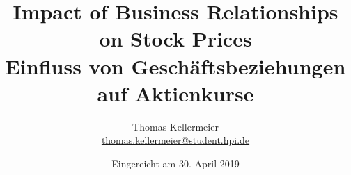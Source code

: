\titlehead{
    \hfill\texttt{[image: setup/logo/01\_UP]} \hfill \texttt{[image: setup/logo/hpi\_logo]}
}
\subject{Masterarbeit}
\title{
    Impact of Business Relationships on Stock Prices
    \\ \bigskip
    \large{Einfluss von Gesch\"aftsbeziehungen auf Aktienkurse}
}
\author{Thomas Kellermeier\\{\small{\url{thomas.kellermeier@student.hpi.de}}}}
\date{Eingereicht am 30. April 2019}
\publishers{
    Universit\"at Potsdam\\
    Digital Engineering Fakult\"at\\
    Fachgebiet Informationssysteme \\
    Betreuung: Tim Repke
}
